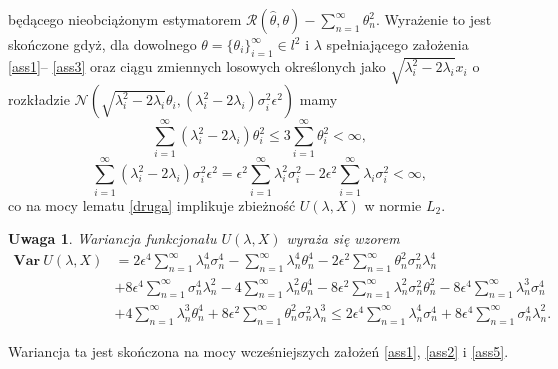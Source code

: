 \documentclass[man,mfiu]{mgrwms}
\newtheorem{uw}{Uwaga}[chapter]
\begin{document}
będącego nieobciążonym estymatorem $\mathcal{R}(\hat{\theta},\theta)-\sum_{n=1}^{\infty}\theta_n^2$. Wyrażenie to jest skończone gdyż, dla dowolnego $\theta=\{\theta_i\}_{i=1}^{\infty}\in l^2$ i $\lambda$ spełniającego założenia \ref{ass1}-- \ref{ass3} oraz ciągu zmiennych losowych określonych jako $\sqrt{\lambda_i^2-2\lambda_i}x_i$ o rozkładzie $\mathcal{N}(\sqrt{\lambda_i^2-2\lambda_i}\theta_i,(\lambda_i^2-2\lambda_i)\sigma_i^2\epsilon^2)$ mamy
\begin{displaymath}
\sum_{i=1}^{\infty}(\lambda_i^2-2\lambda_i)\theta_i^2\leq 3\sum_{i=1}^{\infty}\theta_i^2<\infty,
\end{displaymath}
\begin{displaymath}
\sum_{i=1}^{\infty}(\lambda_i^2-2\lambda_i)\sigma_i^2\epsilon^2=\epsilon^2\sum_{i=1}^{\infty}\lambda_i^2\sigma_i^2-2\epsilon^2\sum_{i=1}^{\infty}\lambda_i\sigma_i^2<\infty,
\end{displaymath}
co na mocy lematu \ref{druga} implikuje zbieżność $U(\lambda,X)$ w normie $L_2$.
\begin{uw}
Wariancja funkcjonału $U(\lambda,X)$ wyraża się wzorem
\begin{displaymath}
\begin{split}
\textbf{Var}\  U(\lambda,X)&=2\epsilon^4\sum_{n=1}^{\infty}\lambda_n^4\sigma_n^4-\sum_{n=1}^{\infty}\lambda_n^4\theta_n^4-2\epsilon^2\sum_{n=1}^{\infty}\theta_n^2\sigma_n^2\lambda_n^4\\
&+8\epsilon^4\sum_{n=1}^{\infty}\sigma_n^4\lambda_n^2-4\sum_{n=1}^{\infty}\lambda_n^2\theta_n^4-8\epsilon^2\sum_{n=1}^{\infty}\lambda_n^2\sigma_n^2\theta_n^2-8\epsilon^4\sum_{n=1}^{\infty}\lambda_n^3\sigma_n^4\\
&+4\sum_{n=1}^{\infty}\lambda_n^3\theta_n^4+8\epsilon^2\sum_{n=1}^{\infty}\theta_n^2\sigma_n^2\lambda_n^3 \leq 2\epsilon^4\sum_{n=1}^{\infty}\lambda_n^4\sigma_n^4+8\epsilon^4\sum_{n=1}^{\infty}\sigma_n^4\lambda_n^2.
\end{split}
\end{displaymath}
\end{uw}
Wariancja ta jest skończona na mocy wcześniejszych założeń \ref{ass1}, \ref{ass2} i \ref{ass5}.
\end{document}
